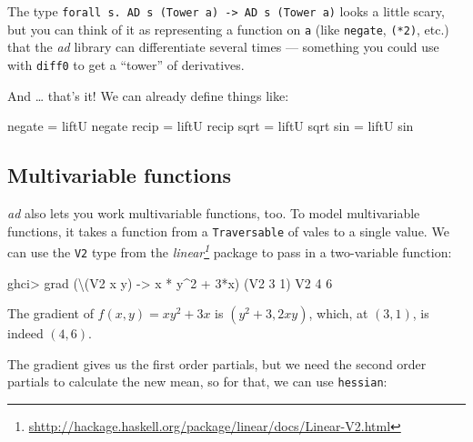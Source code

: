 \documentclass[]{article}
\newenvironment{Shaded}{}{}
\newcommand{\DataTypeTok}[1]{\textcolor[rgb]{0.56,0.13,0.00}{#1}}
\newcommand{\DecValTok}[1]{\textcolor[rgb]{0.25,0.63,0.44}{#1}}
\newcommand{\FunctionTok}[1]{\textcolor[rgb]{0.02,0.16,0.49}{#1}}
\newcommand{\NormalTok}[1]{#1}
\newcommand{\OperatorTok}[1]{\textcolor[rgb]{0.40,0.40,0.40}{#1}}
\newcommand{\OtherTok}[1]{\textcolor[rgb]{0.00,0.44,0.13}{#1}}
\renewcommand{\href}[2]{#2\footnote{\url{#1}}}
\begin{document}
The type
\texttt{forall\ s.\ AD\ s\ (Tower\ a)\ -\textgreater{}\ AD\ s\ (Tower\ a)} looks
a little scary, but you can think of it as representing a function on \texttt{a}
(like \texttt{negate}, \texttt{(*2)}, etc.) that the \emph{ad} library can
differentiate several times --- something you could use with \texttt{diff0} to
get a ``tower'' of derivatives.

And \ldots{} that's it! We can already define things like:

\begin{Shaded}
\begin{Highlighting}[]
\FunctionTok{negate} \OtherTok{=}\NormalTok{ liftU }\FunctionTok{negate}
\FunctionTok{recip}  \OtherTok{=}\NormalTok{ liftU }\FunctionTok{recip}
\FunctionTok{sqrt}   \OtherTok{=}\NormalTok{ liftU }\FunctionTok{sqrt}
\FunctionTok{sin}    \OtherTok{=}\NormalTok{ liftU }\FunctionTok{sin}
\end{Highlighting}
\end{Shaded}

\subsection{Multivariable functions}\label{multivariable-functions}

\emph{ad} also lets you work multivariable functions, too. To model
multivariable functions, it takes a function from a \texttt{Traversable} of
vales to a single value. We can use the \texttt{V2} type from the
\emph{\href{shttp://hackage.haskell.org/package/linear/docs/Linear-V2.html}{linear}}
package to pass in a two-variable function:

\begin{Shaded}
\begin{Highlighting}[]
\NormalTok{ghci}\OperatorTok{\textgreater{}}\NormalTok{ grad (\textbackslash{}(}\DataTypeTok{V2}\NormalTok{ x y) }\OtherTok{{-}\textgreater{}}\NormalTok{ x }\OperatorTok{*}\NormalTok{ y}\OperatorTok{\^{}}\DecValTok{2} \OperatorTok{+} \DecValTok{3}\OperatorTok{*}\NormalTok{x) (}\DataTypeTok{V2} \DecValTok{3} \DecValTok{1}\NormalTok{)}
\DataTypeTok{V2} \DecValTok{4} \DecValTok{6}
\end{Highlighting}
\end{Shaded}

The gradient of \(f(x, y) = x y^2 + 3x\) is \((y^2 + 3, 2xy)\), which, at
\((3, 1)\), is indeed \((4, 6)\).

The gradient gives us the first order partials, but we need the second order
partials to calculate the new mean, so for that, we can use \texttt{hessian}:
\end{document}
